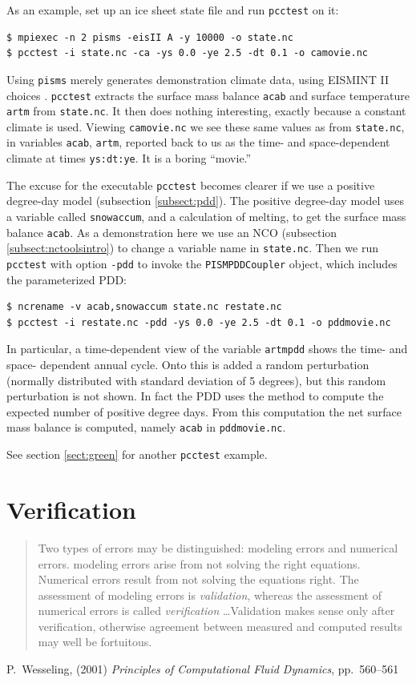 \documentclass[11pt,final]{amsart}
\begin{document}
\bigskip
As an example, set up an ice sheet state file and run \verb|pcctest| on it:
\begin{verbatim}
$ mpiexec -n 2 pisms -eisII A -y 10000 -o state.nc
$ pcctest -i state.nc -ca -ys 0.0 -ye 2.5 -dt 0.1 -o camovie.nc
\end{verbatim}
Using \verb|pisms| merely generates demonstration climate data, using
EISMINT II choices \cite{EISMINT00}.  \verb|pcctest| extracts the 
surface mass balance \verb|acab| and surface temperature \verb|artm| from \verb|state.nc|.
It then does nothing interesting, exactly because a constant climate
is used.  Viewing \verb|camovie.nc| we see these same values as from \verb|state.nc|,
in variables \verb|acab|, \verb|artm|, reported back to us as the time- and space-dependent
climate at times \verb|ys:dt:ye|.  It is a boring ``movie.''

The excuse for the executable \verb|pcctest| becomes clearer if we use a positive degree-day
model (subsection \ref{subsect:pdd}).  The positive degree-day
model uses a variable called \verb|snowaccum|, and a calculation of melting, to get the
surface mass balance \verb|acab|.  As a demonstration here we use an NCO (subsection 
\ref{subsect:nctoolsintro}) to change a variable name in \verb|state.nc|.  Then we run \verb|pcctest|
with option \verb|-pdd| to invoke the \verb|PISMPDDCoupler|
object, which includes the parameterized PDD:
\begin{verbatim}
$ ncrename -v acab,snowaccum state.nc restate.nc
$ pcctest -i restate.nc -pdd -ys 0.0 -ye 2.5 -dt 0.1 -o pddmovie.nc
\end{verbatim}
In particular, a time-dependent view of the variable \verb|artmpdd| shows the time- and space-
dependent annual cycle.  Onto this is added a random perturbation (normally distributed with standard 
deviation of 5 degrees), but this random perturbation is not shown.  In fact the PDD uses the
\cite{CalovGreve05} method to compute the expected number of positive degree days.  From this
computation the net surface mass balance is computed, namely \verb|acab| in \verb|pddmovie.nc|.

See section \ref{sect:green} for another \verb|pcctest| example.


\clearpage\newpage
\section{Verification}\label{sect:verif}

\bigskip
\begin{quote}  Two types of errors may be distinguished: modeling errors and numerical errors.  modeling errors arise from not solving the right equations.  Numerical errors result from not solving the equations right.  The assessment of modeling errors is \emph{validation}, whereas the assessment of numerical errors is called \emph{verification} \dots  Validation makes sense only after verification, otherwise agreement between measured and computed results may well be fortuitous.
\end{quote}
\hfill P.~Wesseling, (2001)  \emph{Principles of Computational Fluid Dynamics}, pp.~560--561 \cite{Wesseling}
\bigskip
\end{document}
